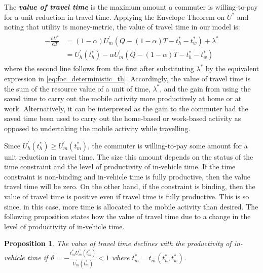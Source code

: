 \documentclass[12pt,a4paper,british]{article}
\newtheorem{prop}{Proposition}[section]
\begin{document}
The \textbf{\textit{value of travel time}} is the maximum amount a commuter is willing-to-pay for a unit reduction in travel time. Applying the Envelope Theorem on $U^{\ast}$ and noting that utility is money-metric, the value of travel time in our model is:
\begin{align}
\begin{split}
-\frac{\mathrm{d}U^{\ast}}{\mathrm{d}T} & = \left(1 - \alpha\right) U_{m}^{\prime}\left( Q - \left(1 - \alpha\right) T - t_{h}^{\ast} - t_{w}^{\ast}\right) + \lambda^{\ast} \\
& = U_{h}^{\prime}\left( t_{h}^{*} \right) - \alpha U_{m}^{\prime}\left( Q - \left(1 - \alpha\right) T - t_{h}^{\ast} - t_{w}^{\ast} \right)
\end{split}
\label{eq:VOT_det}
\end{align}
where the second line follows from the first after substituting $\lambda^{\ast}$ by the equivalent expression in \eqref{eq:foc_deterministic_th}. Accordingly, the value of travel time is the sum of the resource value of a unit of time, $\lambda^{\ast}$, and the gain from using the saved time to carry out the mobile activity more productively at home or at work. Alternatively, it can be interpreted as the gain to the commuter had the saved time been used to carry out the home-based or work-based activity as opposed to undertaking the mobile activity while travelling.

Since $U_{h}^{\prime}\left(t_{h}^{*}\right)\geq U_{m}^{\prime}\left(t_{m}^{\ast}\right)$, the commuter is willing-to-pay some amount for a unit reduction in travel time. The size this amount depends on the status of the time constraint and the level of productivity of in-vehicle time. If the time constraint is non-binding and in-vehicle time is fully productive, then the value travel time will be zero. On the other hand, if the constraint is binding, then the value of travel time is positive even if travel time is fully productive. This is so since, in this case, more time is allocated to the mobile activity than desired. The following proposition states how the value of travel time due to a change in the level of productivity of in-vehicle time. 


\begin{prop}
The value of travel time declines with the productivity of in-vehicle time if $\vartheta = -\frac{t_{m}^{\ast} U_{m}^{\prime\prime} \left( t_{m}^{\ast} \right)} {U_{m}^{\prime}\left( t_{m}^{\ast} \right)}<1$ where $t_{m}^{\ast} = t_{m}\left(t_{h}^{\ast},t_{w}^{\ast}\right)$.
\end{prop}
\end{document}
